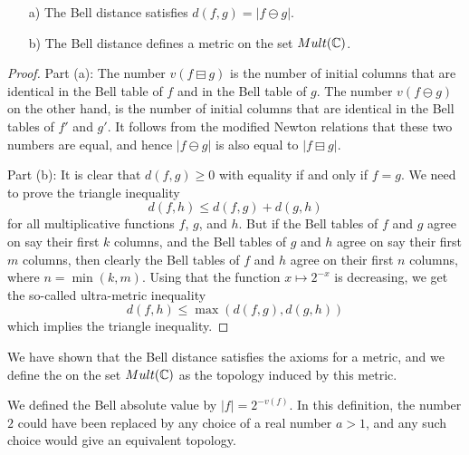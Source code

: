 \begin{lemma}
\begin{itemize}
\item[a)] The Bell distance satisfies $d(f, g) = \vert f \ominus g \vert$.
\item[b)] The Bell distance defines a metric on the set $Mult(\mathbb{C})$.
\end{itemize}
\end{lemma}

\begin{proof}
Part (a): The number $v( f \boxminus g)$ is the number of initial columns that are identical in the Bell table of $f$ and in the Bell table of $g$. The number $v( f \ominus g)$ on the other hand, is the number of initial columns that are identical in the Bell tables of $f'$ and $g'$. It follows from the modified Newton relations that these two numbers are equal, and hence $\vert f \ominus g \vert$ is also equal to $\vert f \boxminus g \vert$.

Part (b): It is clear that $d(f, g) \geq 0$ with equality if and only if $f=g$. We need to prove the triangle inequality
$$  d(f, h)  \leq d(f, g) + d(g, h)   $$
for all multiplicative functions $f$, $g$, and $h$. But if the Bell tables of $f$ and $g$ agree on say their first $k$ columns, and the Bell tables of $g$ and $h$ agree on say their first $m$ columns, then clearly the Bell tables of $f$ and $h$ agree on their first $n$ columns, where $n = \min(k, m)$. Using that the function $x \mapsto 2^{-x}$ is decreasing, we get the so-called ultra-metric inequality
$$   d(f, h)  \leq \max (d(f, g) , d(g, h)  )    $$
which implies the triangle inequality.
\end{proof}

\begin{definition}
We have shown that the Bell distance satisfies the axioms for a metric, and we define the  on the set $Mult(\mathbb{C})$ as the topology induced by this metric. 
\end{definition}

\begin{remark}
We defined the Bell absolute value by $\vert f \vert = 2^{-v(f)}$. In this definition, the number $2$ could have been replaced by any choice of a real number $a > 1$, and any such choice would give an equivalent topology.
\end{remark}





